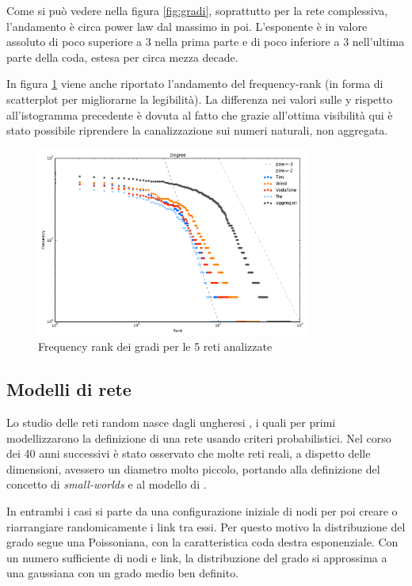 Come si può vedere nella figura \ref{fig:gradi}, soprattutto per la rete complessiva, l'andamento è circa power law dal massimo in poi. L'esponente è in valore assoluto di poco superiore a 3 nella prima parte e di poco inferiore a 3 nell'ultima parte della coda, estesa per circa mezza decade.

In figura \ref{fig:kfreqrank} viene anche riportato l'andamento del frequency-rank (in forma di scatterplot per migliorarne la legibilità). La differenza nei valori sulle y rispetto all'istogramma precedente è dovuta al fatto che grazie all'ottima visibilità qui è stato possibile riprendere la canalizzazione sui numeri naturali, non aggregata.

\begin{figure}[t]
	\centering
	\includegraphics[width=0.8\textwidth]{./Immagini/Dati/kfreqrank}
	\caption{Frequency rank dei gradi per le 5 reti analizzate}
	\label{fig:kfreqrank}
\end{figure}

\subsection{Modelli di rete}

Lo studio delle reti random nasce dagli ungheresi \textcite{Erdos1959}, i quali per primi modellizzarono la definizione di una rete usando criteri probabilistici. Nel corso dei 40 anni successivi è stato osservato che molte reti reali, a dispetto delle dimensioni, avessero un diametro molto piccolo, portando alla definizione del concetto di \emph{small-worlds} e al modello di \textcite{Watts1998}.

In entrambi i casi si parte da una configurazione iniziale di nodi per poi creare o riarrangiare randomicamente i link tra essi. Per questo motivo la distribuzione del grado segue una Poissoniana, con la caratteristica coda destra esponenziale. Con un numero sufficiente di nodi e link, la distribuzione del grado si approssima a una gaussiana con un grado medio ben definito.

